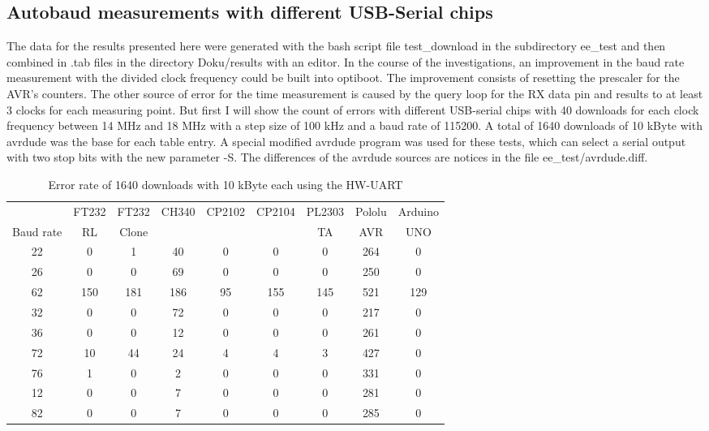 \subsection{Autobaud measurements with different USB-Serial chips}

The data for the results presented here were generated with the bash script file test\_download
in the subdirectory ee\_test and then combined in .tab files in the directory Doku/results with an editor.
In the course of the investigations, an improvement in the baud rate measurement with the divided clock frequency
could be built into optiboot.
The improvement consists of resetting the prescaler for the AVR's counters.
The other source of error for the time measurement is caused by the query loop for the RX data pin and
results to at least 3 clocks for each measuring point.
But first I will show the count of errors with different USB-serial chips with 40 downloads for
each clock frequency between 14 MHz and 18 MHz with a step size of 100 kHz and a baud rate of 115200.
A total of 1640 downloads of 10 kByte with avrdude was the base for each table entry.
A special modified avrdude program was used for these tests,
which can select a serial output with two stop bits with the new parameter -S.
The differences of the avrdude sources are notices in the file ee\_test/avrdude.diff.


\begin{table}[H]
  \begin{center}
    \begin{tabular}{| c || c | c | c | c | c | c | c | c | }
    \hline
          & FT232 & FT232 & CH340 & CP2102 & CP2104 & PL2303 & Pololu & Arduino \\
 Baud rate & RL    & Clone &       &        &       & TA     & AVR    & UNO     \\
    \hline
    \hline
    22    &  0    &  1    &  40   &   0    &   0    &  0     &  264   &   0    \\
    26    &  0    &  0    &  69   &   0    &   0    &  0     &  250   &   0    \\
    62    &  150  &  181  &  186  &   95   &   155  &  145   &  521   &   129  \\
    \hline
    32    &  0    &  0    &  72   &   0    &   0    &  0     &  217   &   0    \\
    36    &  0    &  0    &  12   &   0    &   0    &  0     &  261   &   0    \\
    72    &  10   &  44   &  24   &   4    &   4    &  3     &  427   &   0    \\
    76    &  1    &  0    &  2    &   0    &   0    &  0     &  331   &   0    \\
    \hline
    12    &  0    &  0    &  7    &   0    &   0    &  0     &  281   &   0    \\
    82    &  0    &  0    &  7    &   0    &   0    &  0     &  285   &   0    \\
    \hline
    \end{tabular}
  \end{center}
  \caption{Error rate of 1640 downloads with 10 kByte each using the HW-UART}
  \label{tab:HWautoErrs}
\end{table}

